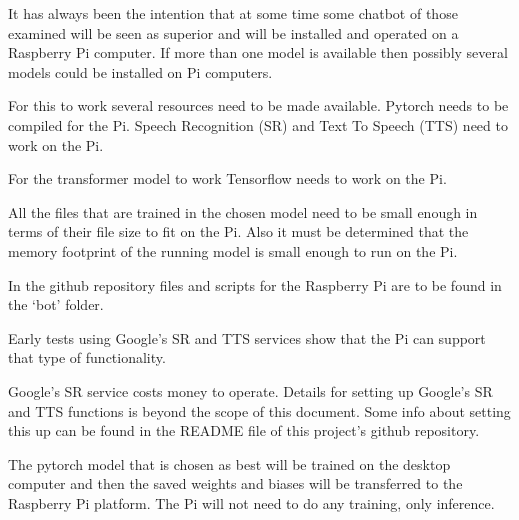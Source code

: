 It has always been the intention that at some time some chatbot of
those examined will be seen as superior and will be installed and
operated on a Raspberry Pi computer. If more than one model is available
then possibly several models could be installed on Pi computers.

For this to work several resources need to be made available. Pytorch
needs to be compiled for the Pi. Speech Recognition (SR) and Text
To Speech (TTS) need to work on the Pi.

For the transformer model to work Tensorflow needs to work on the Pi.

All the files that are trained in the chosen model need to be small
enough in terms of their file size to fit on the Pi. Also it must
be determined that the memory footprint of the running model is small
enough to run on the Pi.

In the github repository files and scripts for the Raspberry Pi are
to be found in the \textquoteleft bot\textquoteright{} folder.

Early tests using Google\textquoteright s SR and TTS services show
that the Pi can support that type of functionality. 

Google's SR service costs money to operate. Details
for setting up Google's SR and TTS functions is beyond
the scope of this document. Some info about setting this up can be
found in the README file of this project\textquoteright s github
repository.

The pytorch model that is chosen as best will be trained on the
desktop computer and then the saved weights and biases will be transferred
to the Raspberry Pi platform. The Pi will not need to do any training,
only inference. 

